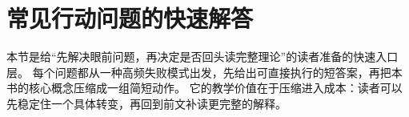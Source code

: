 \section{常见行动问题的快速解答}

本节是给“先解决眼前问题，再决定是否回头读完整理论”的读者准备的快速入口层。
每个问题都从一种高频失败模式出发，先给出可直接执行的短答案，再把本书的核心概念压缩成一组简短动作。
它的教学价值在于压缩进入成本：读者可以先稳定住一个具体转变，再回到前文补读更完整的解释。






